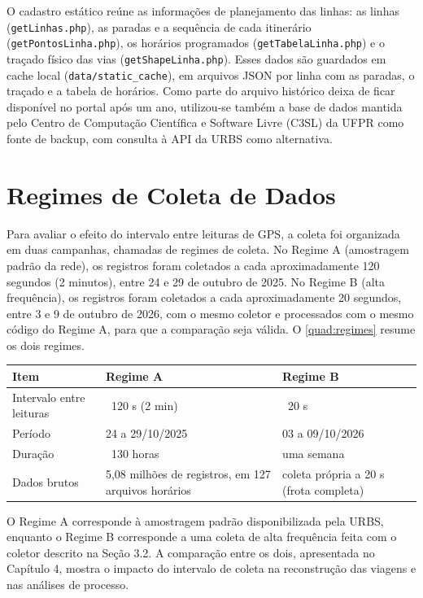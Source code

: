 O cadastro estático reúne as informações de planejamento das linhas: as linhas (\texttt{getLinhas.php}), as paradas e a sequência de cada itinerário (\texttt{getPontosLinha.php}), os horários programados (\texttt{getTabelaLinha.php}) e o traçado físico das vias (\texttt{getShapeLinha.php}). Esses dados são guardados em cache local (\texttt{data/static\_cache}), em arquivos JSON por linha com as paradas, o traçado e a tabela de horários. Como parte do arquivo histórico deixa de ficar disponível no portal após um ano, utilizou-se também a base de dados mantida pelo Centro de Computação Científica e Software Livre (C3SL) da UFPR como fonte de backup, com consulta à API da URBS como alternativa.
\section{Regimes de Coleta de Dados}\label{sec:regimes}

Para avaliar o efeito do intervalo entre leituras de GPS, a coleta foi organizada em duas campanhas, chamadas de regimes de coleta. No Regime A (amostragem padrão da rede), os registros foram coletados a cada aproximadamente 120 segundos (2 minutos), entre 24 e 29 de outubro de 2025. No Regime B (alta frequência), os registros foram coletados a cada aproximadamente 20 segundos, entre 3 e 9 de outubro de 2026, com o mesmo coletor e processados com o mesmo código do Regime A, para que a comparação seja válida. O \autoref{quad:regimes} resume os dois regimes.

\begin{tabframed}[htb]
\caption{Regimes de coleta de dados}
\label{quad:regimes}
\begin{tabular}{|p{4cm}|p{4.7cm}|p{4.7cm}|}
\hline
\textbf{Item} & \textbf{Regime A} & \textbf{Regime B} \\ \hline
Intervalo entre leituras & ~120 s (2 min) & ~20 s \\ \hline
Período & 24 a 29/10/2025 & 03 a 09/10/2026 \\ \hline
Duração & ~130 horas & uma semana \\ \hline
Dados brutos & 5,08 milhões de registros, em 127 arquivos horários & coleta própria a 20 s (frota completa) \\ \hline
\end{tabular}
\fonte{}
\end{tabframed}

O Regime A corresponde à amostragem padrão disponibilizada pela URBS, enquanto o Regime B corresponde a uma coleta de alta frequência feita com o coletor descrito na Seção 3.2. A comparação entre os dois, apresentada no Capítulo 4, mostra o impacto do intervalo de coleta na reconstrução das viagens e nas análises de processo.
